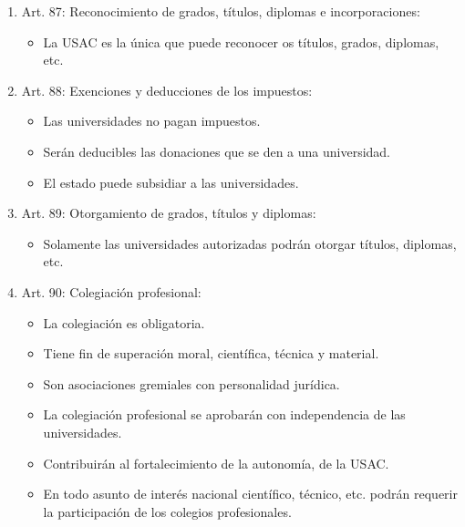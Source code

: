 \begin{enumerate}
    \item Art. 87: Reconocimiento de grados, títulos, diplomas e incorporaciones:  
        \begin{itemize}
            \item La USAC es la única que puede reconocer os títulos, grados, diplomas, etc.
        \end{itemize}
    
    \item Art. 88: Exenciones y deducciones de los impuestos: 
        \begin{itemize}
            \item Las universidades no pagan impuestos.
            \item Serán deducibles las donaciones que se den a una universidad.
            \item El estado puede subsidiar a las universidades.
        \end{itemize}
    
    \item Art. 89: Otorgamiento de grados, títulos y diplomas:
        \begin{itemize}
            \item Solamente las universidades autorizadas podrán otorgar títulos, diplomas, etc.
        \end{itemize}
    
    \item Art. 90: Colegiación profesional:
        \begin{itemize}
            \item La colegiación es obligatoria.
            \item Tiene fin de superación moral, científica, técnica y material.
            \item Son asociaciones gremiales con personalidad jurídica.
            \item La colegiación profesional se aprobarán con independencia de las universidades.
            \item Contribuirán al fortalecimiento de la autonomía, de la USAC.
            \item En todo asunto de interés nacional científico, técnico, etc. podrán requerir la participación de los colegios profesionales.
        \end{itemize}
\end{enumerate}

